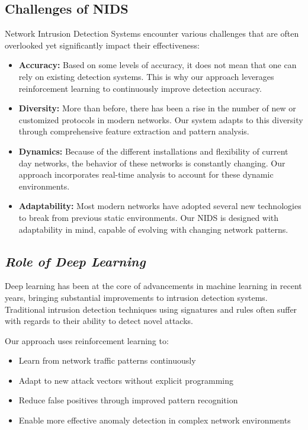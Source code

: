 \documentclass[12pt]{article}
\begin{document}
\subsection{Challenges of NIDS}
Network Intrusion Detection Systems encounter various challenges that are often overlooked yet significantly impact their effectiveness:

\begin{itemize}
  \item \textbf{Accuracy:} Based on some levels of accuracy, it does not mean that one can rely on existing detection systems. This is why our approach leverages reinforcement learning to continuously improve detection accuracy.
  
  \item \textbf{Diversity:} More than before, there has been a rise in the number of new or customized protocols in modern networks. Our system adapts to this diversity through comprehensive feature extraction and pattern analysis.
  
  \item \textbf{Dynamics:} Because of the different installations and flexibility of current day networks, the behavior of these networks is constantly changing. Our approach incorporates real-time analysis to account for these dynamic environments.
  
  \item \textbf{Adaptability:} Most modern networks have adopted several new technologies to break from previous static environments. Our NIDS is designed with adaptability in mind, capable of evolving with changing network patterns.
\end{itemize}

\subsection{\textit{Role of Deep Learning}}
Deep learning has been at the core of advancements in machine learning in recent years, bringing substantial improvements to intrusion detection systems. Traditional intrusion detection techniques using signatures and rules often suffer with regards to their ability to detect novel attacks. 

Our approach uses reinforcement learning to:
\begin{itemize}
  \item Learn from network traffic patterns continuously
  \item Adapt to new attack vectors without explicit programming
  \item Reduce false positives through improved pattern recognition
  \item Enable more effective anomaly detection in complex network environments
\end{itemize}
\end{document}
